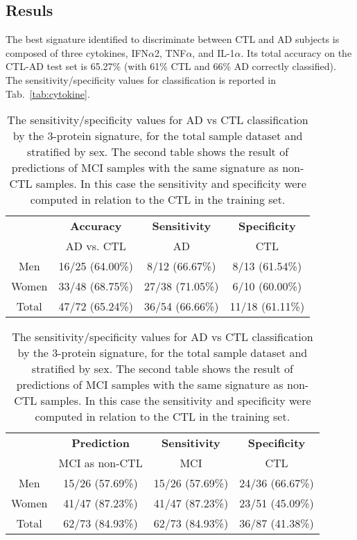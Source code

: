 \documentclass{standalone}
\begin{document}
\subsection[Results]{Resuls}\label{cytokine:cytokine_result}

The best signature identified to discriminate between CTL and AD subjects is composed of three cytokines, IFN$\alpha$2, TNF$\alpha$, and IL-1$\alpha$.
Its total accuracy on the CTL-AD test set is 65.27\% (with 61\% CTL and 66\% AD correctly classified).
The sensitivity/specificity values for classification is reported in Tab.~\ref{tab:cytokine}.

\begin{table}[!htb]
  \begin{minipage}{.5\linewidth}
    \caption{}
    \centering
      \begin{tabular}{cccc}
          \hline \rowcolor{darkgrayrow}
                      &  \textbf{Accuracy}  &  \textbf{Sensitivity}  &  \textbf{Specificity} \\
                      &  AD vs. CTL         &  AD                    &    CTL                \\
          \hline
              Men     &    16/25 (64.00\%)  &    8/12 (66.67\%)      &    8/13 (61.54\%)     \\
              Women   &    33/48 (68.75\%)  &   27/38 (71.05\%)      &    6/10 (60.00\%)     \\
              Total   &    47/72 (65.24\%)  &   36/54 (66.66\%)      &   11/18 (61.11\%)     \\
          \hline
      \end{tabular}
  \end{minipage}%
  \begin{minipage}{.5\linewidth}
    \centering
      \caption{}
      \begin{tabular}{cccc}
          \hline \rowcolor{darkgrayrow}
                      & \textbf{Prediction} &  \textbf{Sensitivity}  &  \textbf{Specificity} \\
                      &  MCI as non-CTL     &  MCI                   &    CTL                \\
          \hline
              Men     &    15/26 (57.69\%)  &   15/26 (57.69\%)      &   24/36 (66.67\%)     \\
              Women   &    41/47 (87.23\%)  &   41/47 (87.23\%)      &   23/51 (45.09\%)     \\
              Total   &    62/73 (84.93\%)  &   62/73 (84.93\%)      &   36/87 (41.38\%)     \\
          \hline
      \end{tabular}
  \end{minipage}
  \caption{The sensitivity/specificity values for AD vs CTL classification by the 3-protein signature, for the total sample dataset and stratified by sex.
    The second table shows the result of predictions of MCI samples with the same signature as non-CTL samples.
    In this case the sensitivity and specificity were computed in relation to the CTL in the training set.
  }
\end{table}
\end{document}
